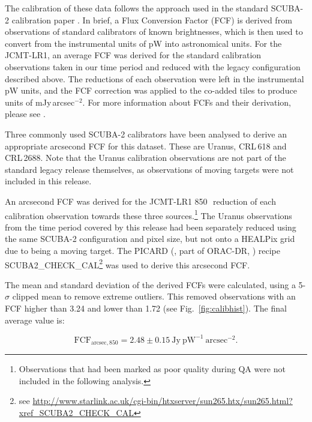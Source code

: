 \documentclass[twocolumn,times]{aastex6}
\newcommand{\ascl}[1]{\href{http://www.ascl.net/#1}{ascl:#1}}
\begin{document}
The calibration of these data follows the approach used in the
standard SCUBA-2 calibration paper \citep{Dempsey2013}. In brief, a
Flux Conversion Factor (FCF) is derived from observations of standard
calibrators of known brightnesses, which is then used to convert from
the instrumental units of pW into astronomical units. For the
JCMT-LR1, an average FCF was derived for the standard calibration
observations taken in our time period and reduced with the legacy
configuration described above.  The reductions of each observation
were left in the instrumental pW units, and the FCF correction was
applied to the co-added tiles to produce units of
mJy\,arcsec$^{-2}$. For more information about FCFs and their
derivation, please see \citet{Dempsey2013}.

Three commonly used SCUBA-2 calibrators have been analysed to derive
an appropriate arcsecond FCF for this dataset. These are Uranus,
CRL\,618 and CRL\,2688. Note that the Uranus calibration observations
are not part of the standard legacy release themselves, as
observations of moving targets were not included in this release.

An arcsecond FCF was derived for the JCMT-LR1 850\,\micron\ reduction
of each calibration observation towards these three
sources.\footnote{Observations that had been marked as poor quality
  during QA were not included in the following analysis.}  The Uranus
observations from the time period covered by this release had been
separately reduced using the same SCUBA-2 configuration and pixel
size, but not onto a HEALPix grid due to being a moving target. The
PICARD (\citealp{SUN265}, part of ORAC-DR, \citealp[][\ascl{1310.001}]{SUN230})
recipe SCUBA2\_CHECK\_CAL\footnote{see
  \url{http://www.starlink.ac.uk/cgi-bin/htxserver/sun265.htx/sun265.html?xref_SCUBA2_CHECK_CAL}}
was used to derive this arcsecond FCF.

The mean and standard deviation of the derived FCFs were calculated,
using a 5-$\sigma$ clipped mean to remove extreme outliers. This removed
observations with an FCF higher than 3.24 and lower than 1.72 (see
Fig.~\ref{fig:calibhist}). The final average value is:

\begin{equation}
\mathrm{FCF}_{\mathrm{arcsec},850} = 2.48 \pm 0.15\ \mathrm{Jy}\ \mathrm{pW}^{-1}\  \mathrm{arcsec}^{-2}.
\end{equation}
\end{document}
